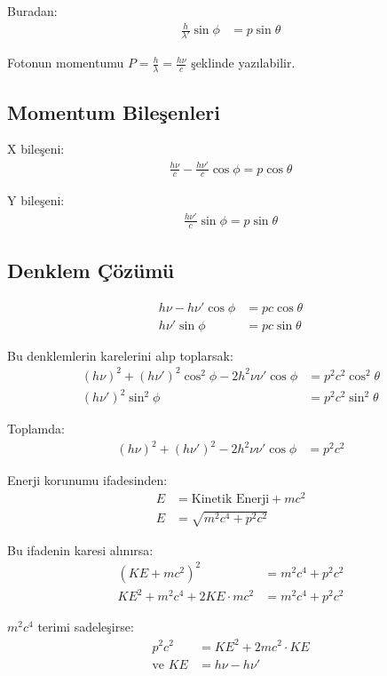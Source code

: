 \documentclass[11pt,letterpaper]{fenbil}
\begin{document}
Buradan:
\begin{align}
\frac{h}{\lambda'}\sin\phi &= p\sin\theta
\end{align}

Fotonun momentumu $P = \frac{h}{\lambda} = \frac{h\nu}{c}$ şeklinde yazılabilir.

\subsection{Momentum Bileşenleri}

X bileşeni:
\begin{align}
\frac{h\nu}{c} - \frac{h\nu'}{c}\cos\phi = p\cos\theta
\end{align}

Y bileşeni:
\begin{align}
\frac{h\nu'}{c}\sin\phi = p\sin\theta
\end{align}

\subsection{Denklem Çözümü}

\begin{align}
h\nu - h\nu'\cos\phi &= pc\cos\theta \\
h\nu'\sin\phi &= pc\sin\theta
\end{align}

Bu denklemlerin karelerini alıp toplarsak:
\begin{align}
(h\nu)^2 + (h\nu')^2\cos^2\phi - 2h^2\nu\nu'\cos\phi &= p^2c^2\cos^2\theta \\
(h\nu')^2\sin^2\phi &= p^2c^2\sin^2\theta
\end{align}

Toplamda:
\begin{align}
(h\nu)^2 + (h\nu')^2 - 2h^2\nu\nu'\cos\phi &= p^2c^2
\end{align}

Enerji korunumu ifadesinden:
\begin{align}
E &= \text{Kinetik Enerji} + mc^2 \\
E &= \sqrt{m^2c^4 + p^2c^2}
\end{align}

Bu ifadenin karesi alınırsa:
\begin{align}
(KE + mc^2)^2 &= m^2c^4 + p^2c^2 \\
KE^2 + m^2c^4 + 2KE\cdot mc^2 &= m^2c^4 + p^2c^2
\end{align}

$m^2c^4$ terimi sadeleşirse:
\begin{align}
p^2c^2 &= KE^2 + 2mc^2\cdot KE \\
\text{ve } KE &= h\nu - h\nu'
\end{align}
\end{document}
